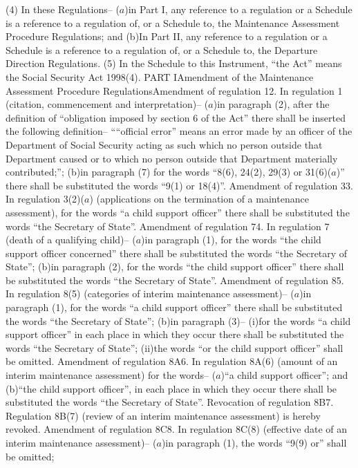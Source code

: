 \documentclass[12pt,a4paper]{article}
\begin{document}
(4) In these Regulations–
($a$)in Part I, any reference to a regulation or a Schedule is a reference to a regulation of, or a Schedule to, the Maintenance Assessment Procedure Regulations; and
(b)In Part II, any reference to a regulation or a Schedule is a reference to a regulation of, or a Schedule to, the Departure Direction Regulations.
(5) In the Schedule to this Instrument, “the Act” means the Social Security Act 1998(4).
PART IAmendment of the Maintenance Assessment Procedure RegulationsAmendment of regulation 12.  In regulation 1 (citation, commencement and interpretation)–
($a$)in paragraph (2), after the definition of “obligation imposed by section 6 of the Act” there shall be inserted the following definition–
““official error” means an error made by an officer of the Department of Social Security acting as such which no person outside that Department caused or to which no person outside that Department materially contributed;”;
(b)in paragraph (7) for the words “8(6), 24(2), 29(3) or 31(6)($a$)” there shall be substituted the words “9(1) or 18(4)”.
Amendment of regulation 33.  In regulation 3(2)($a$) (applications on the termination of a maintenance assessment), for the words “a child support officer” there shall be substituted the words “the Secretary of State”.
Amendment of regulation 74.  In regulation 7 (death of a qualifying child)–
($a$)in paragraph (1), for the words “the child support officer concerned” there shall be substituted the words “the Secretary of State”;
(b)in paragraph (2), for the words “the child support officer” there shall be substituted the words “the Secretary of State”.
Amendment of regulation 85.  In regulation 8(5) (categories of interim maintenance assessment)–
($a$)in paragraph (1), for the words “a child support officer” there shall be substituted the words “the Secretary of State”;
(b)in paragraph (3)–
(i)for the words “a child support officer” in each place in which they occur there shall be substituted the words “the Secretary of State”;
(ii)the words “or the child support officer” shall be omitted.
Amendment of regulation 8A6.  In regulation 8A(6) (amount of an interim maintenance assessment) for the words–
($a$)“a child support officer”; and
(b)“the child support officer”,
in each place in which they occur there shall be substituted the words “the Secretary of State”.
Revocation of regulation 8B7.  Regulation 8B(7) (review of an interim maintenance assessment) is hereby revoked.
Amendment of regulation 8C8.  In regulation 8C(8) (effective date of an interim maintenance assessment)–
($a$)in paragraph (1), the words “9(9) or” shall be omitted;
\end{document}
